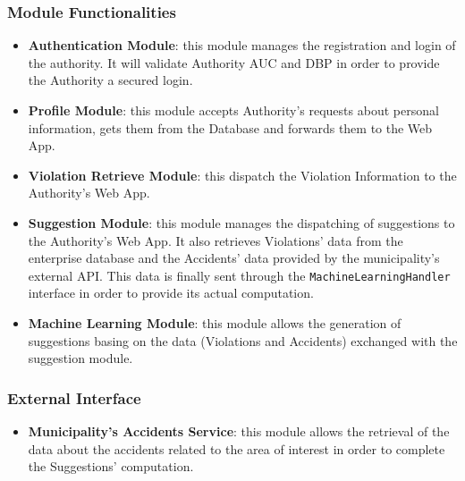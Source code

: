 \documentclass[12pt,a4paper]{article}
\begin{document}
\subsubsection*{Module Functionalities}
\begin{itemize}
\item \textbf{Authentication Module}: this module manages the registration and login of the authority. It will validate Authority AUC and DBP in order to provide the Authority a secured login.
\item \textbf{Profile Module}: this module accepts Authority's requests about personal information, gets them from the Database and forwards them to the Web App.
\item \textbf{Violation Retrieve Module}: this dispatch the Violation Information to the Authority's Web App.
\item \textbf{Suggestion Module}: this module manages the dispatching of suggestions to the Authority's Web App. It also retrieves Violations' data from the enterprise database and the Accidents' data provided by the municipality's external API. This data is finally sent through the \texttt{MachineLearningHandler} interface in order to provide its actual computation.
\item \textbf{Machine Learning Module}: this module allows the generation of suggestions basing on the data (Violations and Accidents) exchanged with the suggestion module.
\end{itemize}
\subsubsection*{External Interface}
\begin{itemize}
\item \textbf{Municipality's Accidents Service}: this module allows the retrieval of the data about the accidents related to the area of interest in order to complete the Suggestions' computation.
\end{itemize}
\end{document}
